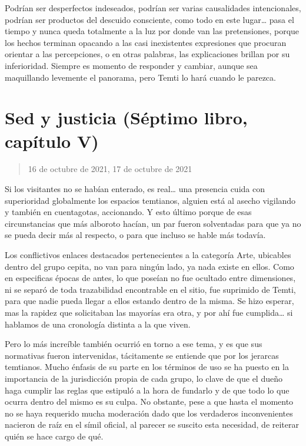 \documentclass[
]{book}
\begin{document}
Podrían ser desperfectos indeseados, podrían ser varias causalidades intencionales, podrían ser productos del descuido consciente, como todo en este lugar\ldots{} pasa el tiempo y nunca queda totalmente a la luz por donde van las pretensiones, porque los hechos terminan opacando a las casi inexistentes expresiones que procuran orientar a las percepciones, o en otras palabras, las explicaciones brillan por su inferioridad. Siempre es momento de responder y cambiar, aunque sea maquillando levemente el panorama, pero Temti lo hará cuando le parezca.

\hypertarget{sed-y-justicia-suxe9ptimo-libro-capuxedtulo-v}{%
\section{Sed y justicia (Séptimo libro, capítulo V)}\label{sed-y-justicia-suxe9ptimo-libro-capuxedtulo-v}}

\begin{quote}
16 de octubre de 2021, 17 de octubre de 2021
\end{quote}

Si los visitantes no se habían enterado, es real\ldots{} una presencia cuida con superioridad globalmente los espacios temtianos, alguien está al asecho vigilando y también en cuentagotas, accionando. Y esto último porque de esas circunstancias que más alboroto hacían, un par fueron solventadas para que ya no se pueda decir más al respecto, o para que incluso se hable más todavía.

Los conflictivos enlaces destacados pertenecientes a la categoría Arte, ubicables dentro del grupo cepita, no van para ningún lado, ya nada existe en ellos. Como en especificas épocas de antes, lo que poseían no fue ocultado entre dimensiones, ni se separó de toda trazabilidad encontrable en el sitio, fue suprimido de Temti, para que nadie pueda llegar a ellos estando dentro de la misma. Se hizo esperar, mas la rapidez que solicitaban las mayorías era otra, y por ahí fue cumplida\ldots{} si hablamos de una cronología distinta a la que viven.

Pero lo más increíble también ocurrió en torno a ese tema, y es que sus normativas fueron intervenidas, tácitamente se entiende que por los jerarcas temtianos. Mucho énfasis de su parte en los términos de uso se ha puesto en la importancia de la jurisdicción propia de cada grupo, lo clave de que el dueño haga cumplir las reglas que estipuló a la hora de fundarlo y de que todo lo que ocurra dentro del mismo es su culpa. No obstante, pese a que hasta el momento no se haya requerido mucha moderación dado que los verdaderos inconvenientes nacieron de raíz en el símil oficial, al parecer se suscito esta necesidad, de reiterar quién se hace cargo de qué.
\end{document}

